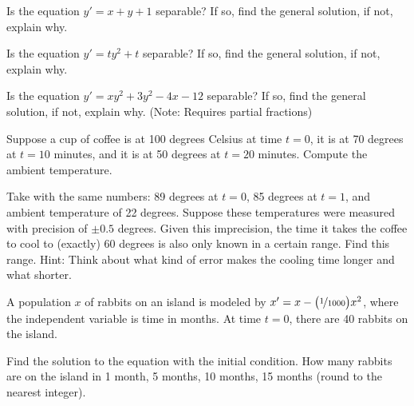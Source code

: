 \documentclass{ximera}
\begin{document}
\begin{exercise}
    Is the equation $y' = x+y+1$ separable? If so, find the general solution, if not, explain why.
\end{exercise}

\begin{exercise}
    Is the equation $y' = ty^2 + t$ separable? If so, find the general solution, if not, explain why.
\end{exercise}

\begin{exercise}
    Is the equation $y' = xy^2 + 3y^2 - 4x - 12$ separable? If so, find the general solution, if not, explain why. (Note: Requires partial fractions)
\end{exercise}

\begin{exercise}
    Suppose a cup of coffee is at 100 degrees Celsius at time $t=0$, it is at 70 degrees at $t=10$ minutes, and it is at 50 degrees at $t=20$ minutes.  Compute the ambient temperature.
\end{exercise}

\begin{exercise}%
    Take  with the same numbers: 89 degrees at $t=0$, 85 degrees at $t=1$, and ambient temperature of 22 degrees.  Suppose these temperatures were measured with precision of $\pm 0.5$ degrees.  Given this imprecision, the time it takes the coffee to cool to (exactly) 60 degrees is also only known in a certain range.  Find this range.  Hint: Think about what kind of error makes the cooling time longer and what shorter.
\end{exercise}

\begin{exercise}%
    A population $x$ of rabbits on an island is modeled by $x' = x- \bigl(\nicefrac{1}{1000} \bigr) x^2$, where the independent variable is time in months.  At time $t=0$, there are 40 rabbits on the island.
    \begin{tasks}
        \task Find the solution to the equation with the initial condition.
        \task How many rabbits are on the island in 1 month, 5 months,  10 months, 15 months (round to the nearest integer).
    \end{tasks}
\end{exercise}

\end{document}
